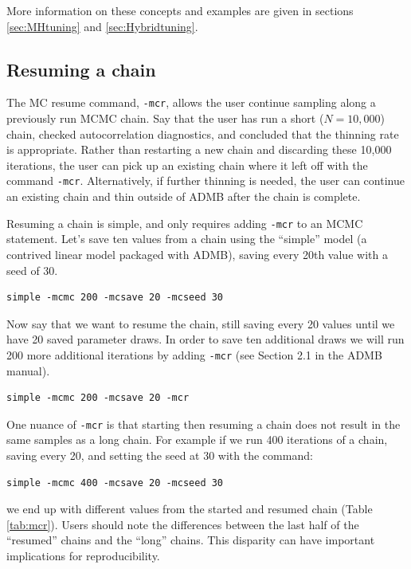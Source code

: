 \documentclass{article}\usepackage[]{graphicx}\usepackage[]{color}
\begin{document}
More information on these concepts and examples are given in sections
\ref{sec:MHtuning} and \ref{sec:Hybridtuning}.

\subsection{Resuming a chain}\label{sec:mcr}
The MC resume command, \texttt{-mcr}, allows the user continue sampling
along a previously run MCMC chain. Say that the user has run a short
($N=10,000$) chain, checked autocorrelation diagnostics, and concluded that
the thinning rate is appropriate. Rather than restarting a new chain and
discarding these 10,000 iterations, the user can pick up an existing chain
where it left off with the command \texttt{-mcr}. Alternatively, if further
thinning is needed, the user can continue an existing chain and thin
outside of ADMB after the chain is complete.

Resuming a chain is simple, and only requires adding \texttt{-mcr} to an MCMC
statement. Let's save ten values from a chain using the ``simple'' model (a
contrived linear model packaged with ADMB), saving every 20th value with
a seed of 30.

\begin{verbatim}
simple -mcmc 200 -mcsave 20 -mcseed 30
\end{verbatim}

Now say that we want to resume the chain, still saving every 20 values
until we have 20 saved parameter draws. In order to save ten additional
draws we will run 200 more additional iterations by adding \texttt{-mcr}
(see Section 2.1 in the ADMB manual).

\begin{verbatim}
simple -mcmc 200 -mcsave 20 -mcr
\end{verbatim}

One nuance of \texttt{-mcr} is that starting then resuming a chain does not
result in the same samples as a long chain. For example if we run 400
iterations of a chain, saving every 20, and setting the seed at 30 with the
command:

\begin{verbatim}
simple -mcmc 400 -mcsave 20 -mcseed 30
\end{verbatim}

we end up with different values from the started and resumed chain (Table \ref{tab:mcr}).
Users should note the differences between the last half of the ``resumed'' chains
and the ``long'' chains. This disparity can have important implications for
reproducibility.
\end{document}

